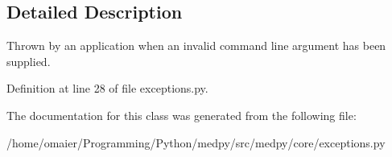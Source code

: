 \subsection{Detailed Description}
Thrown by an application when an invalid command line argument has been supplied. 

Definition at line 28 of file exceptions.py.



The documentation for this class was generated from the following file:\begin{DoxyCompactItemize}
\item 
/home/omaier/Programming/Python/medpy/src/medpy/core/exceptions.py\end{DoxyCompactItemize}
